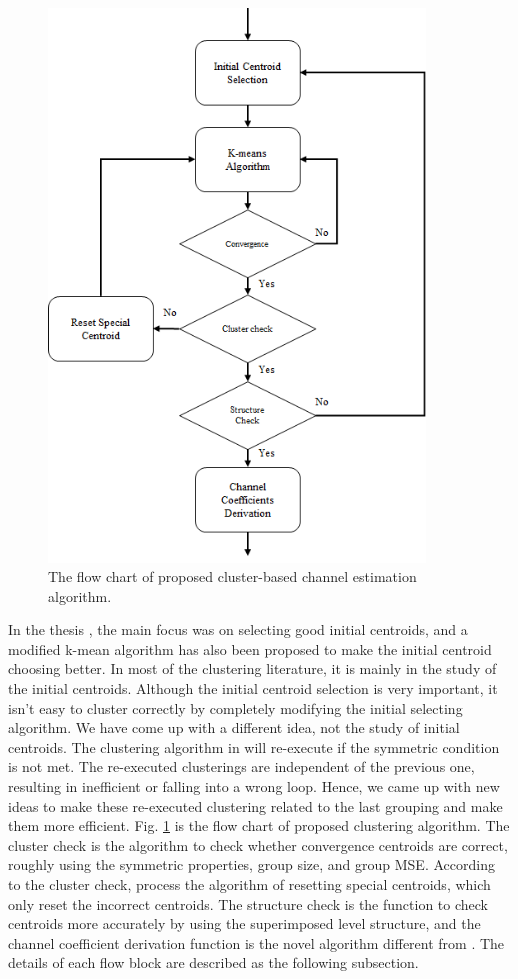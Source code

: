 \begin{figure}[b!]
 \centering
 \includegraphics[width=10cm]{fig/flow_chart_proposed_clustering.png}
 \caption{The flow chart of proposed cluster-based channel estimation algorithm.}
 \label{fig:flow_chart_proposed_clustering}
\end{figure}

In the thesis \cite{yt19}, the main focus was on selecting good initial centroids, and a modified k-mean algorithm has also been proposed to make the initial centroid choosing better. In most of the clustering literature, it is mainly in the study of the initial centroids. Although the initial centroid selection is very important, it isn't easy to cluster correctly by completely modifying the initial selecting algorithm. We have come up with a different idea, not the study of initial centroids. The clustering algorithm in \cite{yt19} will re-execute if the symmetric condition is not met. The re-executed clusterings are independent of the previous one, resulting in inefficient or falling into a wrong loop. Hence, we came up with new ideas to make these re-executed clustering related to the last grouping and make them more efficient. Fig. \ref{fig:flow_chart_proposed_clustering} is the flow chart of proposed clustering algorithm. The cluster check is the algorithm to check whether convergence centroids are correct, roughly using the symmetric properties, group size, and group MSE. According to the cluster check, process the algorithm of resetting special centroids, which only reset the incorrect centroids. The structure check is the function to check centroids more accurately by using the superimposed level structure, and the channel coefficient derivation function is the novel algorithm different from \cite{yt19}.  The details of each flow block are described as the following subsection.


